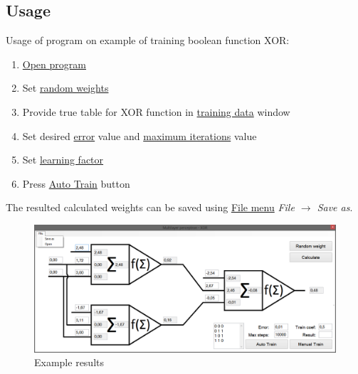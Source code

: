 \newpage

\subsection{Usage}
\label{Usage}

Usage of program on example of training boolean function XOR:
\begin{enumerate}[topsep=8pt,itemsep=-1ex,partopsep=1ex,parsep=1ex]
    \item \hyperref[UserInterface]{Open program}
    \item Set \hyperref[RandomWeight]{random weights}
    \item Provide true table for XOR function in \hyperref[TrainingData]{training data} window
    \item Set desired \hyperref[Error]{error} value and \hyperref[MaxSteps]{maximum iterations} value
    \item Set \hyperref[TrainCoef]{learning factor}
    \item Press \hyperref[AutoTrain]{Auto Train} button
\end{enumerate}

The resulted calculated weights can be saved using \hyperref[FileMenu]{File menu} \textit{File $\rightarrow$ Save as}.

\begin{figure}[!h]
    \centering
    \includegraphics[scale=0.45]{Media/UI.png}
    \caption{Example results}
    \label{fig:ExampleUsage}
\end{figure}